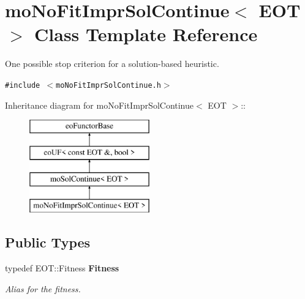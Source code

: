 \section{mo\-No\-Fit\-Impr\-Sol\-Continue$<$ EOT $>$ Class Template Reference}
\label{classmo_no_fit_impr_sol_continue}
One possible stop criterion for a solution-based heuristic.  


{\tt \#include $<$mo\-No\-Fit\-Impr\-Sol\-Continue.h$>$}

Inheritance diagram for mo\-No\-Fit\-Impr\-Sol\-Continue$<$ EOT $>$::\begin{figure}[H]
\begin{center}
\leavevmode
\includegraphics[height=4cm]{classmo_no_fit_impr_sol_continue}
\end{center}
\end{figure}
\subsection*{Public Types}
\begin{CompactItemize}
\item 
typedef EOT::Fitness {\bf Fitness}\label{classmo_no_fit_impr_sol_continue_w0}

\begin{CompactList}\small\item\em Alias for the fitness. \item\end{CompactList}\end{CompactItemize}
